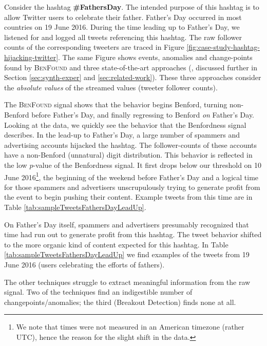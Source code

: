 \documentclass[twoside,leqno,twocolumn]{article}\usepackage[]{graphicx}\usepackage[]{color}
\newcommand{\algoname}{\textsc{BenFound}}
\begin{document}
Consider the hashtag \textbf{\#FathersDay}. The intended purpose of this hashtag is to allow Twitter users to celebrate their father. Father's Day occurred in most countries on 19 June 2016. During the time leading up to Father's Day, we listened for and logged all tweets referencing this hashtag. The raw follower counts of the corresponding tweeters are traced in Figure \ref{fig:case-study-hashtag-hijacking-twitter}. The same Figure shows events, anomalies and change-points found by \algoname{} and three state-of-the-art approaches (\cite{laptev2015egads,james2014twitter,vallis2014novel}, discussed further in Section \ref{sec:synth-exper} and \ref{sec:related-work}). These three approaches consider the \textit{absolute values} of the streamed values (tweeter follower counts).

The \algoname{} signal shows that the behavior begins Benford, turning non-Benford before Father's Day, and finally regressing to Benford \textit{on} Father's Day. Looking at the data, we quickly see the behavior that the Benfordness signal describes. In the lead-up to Father's Day, a large number of spammers and advertising accounts hijacked the hashtag. The follower-counts of these accounts have a non-Benford (unnatural) digit distribution. This behavior is reflected in the low $p$-value of the Benfordness signal. It first drops below our threshold on 10 June 2016\footnote{We note that times were not measured in an American timezone (rather UTC), hence the reason for the slight shift in the data.}, the beginning of the weekend before Father's Day and a logical time for those spammers and advertisers unscrupulously trying to generate profit from the event to begin pushing their content. Example tweets from this time are in Table \ref{tab:sampleTweetsFathersDayLeadUp}.

On Father's Day itself, spammers and advertisers presumably recognized that time had run out to generate profit from this hashtag. The tweet behavior shifted to the more organic kind of content expected for this hashtag. In Table \ref{tab:sampleTweetsFathersDayLeadUp} we find examples of the tweets from 19 June 2016 (users celebrating the efforts of fathers).

The other techniques struggle to extract meaningful information from the raw signal. Two of the techniques find an indigestible number of changepoints/anomalies; the third (Breakout Detection) finds none at all.
\end{document}
